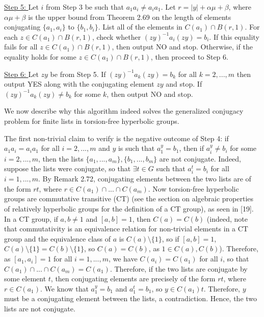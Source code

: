 \documentclass[12pt]{article}
\newcommand{\vs}{\vskip10pt}
\begin{document}
	\vs
	
	\underline{Step 5: } Let $i$ from Step 3 be such that $a_1 a_i \neq a_i a_1$. Let $r = \vert y \vert + \alpha \mu + \beta$, where $\alpha \mu + \beta$ is the upper bound from Theorem 2.69 on the length of elements conjugating $\{a_1, a_i\}$ to $\{b_1, b_i\}$. List all of the elements in $C(a_1) \cap B(r,1)$. For each $z \in C(a_1) \cap B(r,1)$, check whether $(zy)^{-1} a_i (zy) = b_i$. If this equality fails for all $z \in C(a_1) \cap B(r,1)$, then output NO and stop. Otherwise, if the equality holds for some $z \in C(a_1) \cap B(r,1)$, then proceed to Step 6. 
	
	\vs 
	
	\underline{Step 6: } Let $zy$ be from Step 5. If $(zy)^{-1} a_k (zy) = b_k$ for all $k = 2,...,m$ then output YES along with the conjugating element $zy$ and stop. If $(zy)^{-1} a_k (zy) \neq b_k$ for some $k$, then output NO and stop. 
	
	\vs 
	
	We now describe why this algorithm indeed solves the generalized conjugacy problem for finite lists in torsion-free hyperbolic groups.
	
	\vs 
	
	The first non-trivial claim to verify is the negative outcome of Step 4: if $a_1 a_i = a_i a_1$ for all $i = 2,...,m$ and $y$ is such that $a_1^y = b_1$, then if $a_i^y \neq b_i$ for some $i = 2,...,m$, then the lists $\{a_1,...,a_m\}, \{b_1,...,b_m\}$ are not conjugate. Indeed, suppose the lists were conjugate, so that $\exists t \in G$ such that $a_i^t = b_i$ for all $i = 1,...,m$. By Remark 2.72, conjugating elements between the two lists are of the form $rt$, where $r \in C(a_1) \cap ... \cap C(a_m)$. Now torsion-free hyperbolic groups are commutative transitive (CT) (see the section on algebraic properties of relatively hyperbolic groups for the definition of a CT group), as seen in [19]. In a CT group, if $a,b \neq 1$ and $[a,b] = 1$, then $C(a) = C(b)$ (indeed, note that commutativity is an equivalence relation for non-trivial elements in a CT group and the equivalence class of $a$ is $C(a) \setminus \{1\}$, so if $[a,b] = 1$, $C(a) \setminus \{1\} = C(b) \setminus \{1\}$, so $C(a) = C(b)$, as $1 \in C(a), C(b)$). Therefore, as $[a_1, a_i] = 1$ for all $i = 1,...,m$, we have $C(a_i) = C(a_1)$ for all $i$, so that $ C(a_1) \cap ... \cap C(a_m) = C(a_1)$. Therefore, if the two lists are conjugate by some element $t$, then conjugating elements are precisely of the form $rt$, where $r \in C(a_1)$. We know that $a_1^y = b_1$ and $a_1^t = b_1$, so $y \in C(a_1)t$. Therefore, $y$ must be a conjugating element between the lists, a contradiction. Hence, the two lists are not conjugate. 
	
\end{document}
